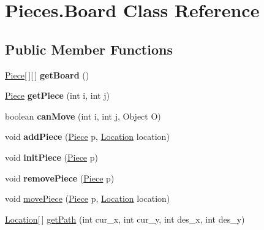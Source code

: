 \hypertarget{classMain_1_1Board}{\section{Pieces.\-Board Class Reference}
\label{classMain_1_1Board}
}
\subsection*{Public Member Functions}
\begin{DoxyCompactItemize}
\item 
\hypertarget{classMain_1_1Board_a4bd1f8b4051884a51a9831d316234296}{\hyperlink{classMain_1_1Piece}{Piece}\mbox{[}$\,$\mbox{]}\mbox{[}$\,$\mbox{]} {\bfseries get\-Board} ()}\label{classMain_1_1Board_a4bd1f8b4051884a51a9831d316234296}

\item 
\hypertarget{classMain_1_1Board_af60163fe1ae1f59892bb625c9b97e2e6}{\hyperlink{classMain_1_1Piece}{Piece} {\bfseries get\-Piece} (int i, int j)}\label{classMain_1_1Board_af60163fe1ae1f59892bb625c9b97e2e6}

\item 
\hypertarget{classMain_1_1Board_a99ef719bcd606d0e64566403673c71ef}{boolean {\bfseries can\-Move} (int i, int j, Object O)}\label{classMain_1_1Board_a99ef719bcd606d0e64566403673c71ef}

\item 
\hypertarget{classMain_1_1Board_a6ee57d27f818873da3204a4175b4d836}{void {\bfseries add\-Piece} (\hyperlink{classMain_1_1Piece}{Piece} p, \hyperlink{classMain_1_1Location}{Location} location)}\label{classMain_1_1Board_a6ee57d27f818873da3204a4175b4d836}

\item 
\hypertarget{classMain_1_1Board_af888c720e9650ed6604976f989a2f9bf}{void {\bfseries init\-Piece} (\hyperlink{classMain_1_1Piece}{Piece} p)}\label{classMain_1_1Board_af888c720e9650ed6604976f989a2f9bf}

\item 
\hypertarget{classMain_1_1Board_ac9d44d8ec14ae68c2751d068fdcb7434}{void {\bfseries remove\-Piece} (\hyperlink{classMain_1_1Piece}{Piece} p)}\label{classMain_1_1Board_ac9d44d8ec14ae68c2751d068fdcb7434}

\item 
void \hyperlink{classMain_1_1Board_a3492838a7e3e95308c156cc1c383ce9f}{move\-Piece} (\hyperlink{classMain_1_1Piece}{Piece} p, \hyperlink{classMain_1_1Location}{Location} location)
\item 
\hyperlink{classMain_1_1Location}{Location}\mbox{[}$\,$\mbox{]} \hyperlink{classMain_1_1Board_a19921e3ee86b292d7a020cc2ad1d0873}{get\-Path} (int cur\-\_\-x, int cur\-\_\-y, int des\-\_\-x, int des\-\_\-y)
\end{DoxyCompactItemize}


